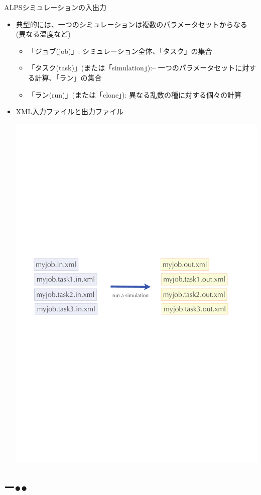 \begin{frame}{ALPSシミュレーションの入出力}
  \begin{itemize}
  \item 典型的には、一つのシミュレーションは複数のパラメータセットからなる(異なる温度など)
    \begin{itemize}
    \item 「ジョブ(job)」: シミュレーション全体、「タスク」の集合
    \item 「タスク(task)」(または「simulation」):– 一つのパラメータセットに対する計算、「ラン」の集合
    \item 「ラン(run)」(または「clone」): 異なる乱数の種に対する個々の計算
    \end{itemize}
  \item XML入力ファイルと出力ファイル
  \begin{center}
    \includegraphics[width=.55\textwidth]{simulation1.pdf}
  \end{center}
  \end{itemize}
\end{frame}

\subsection*{{\protect\color{red}ー}{\protect\color{blue}●}{\protect\color{green}●}}

